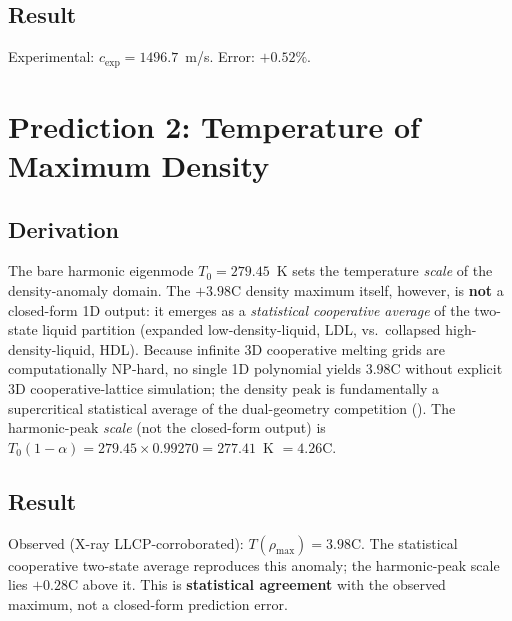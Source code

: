 \subsection{Result}
Experimental: $c_\mathrm{exp} = 1496.7$~m/s. \quad Error: $\mathbf{+0.52\%}$.


\section{Prediction 2: Temperature of Maximum Density}

\subsection{Derivation}

The bare harmonic eigenmode $T_0 = 279.45$~K sets the temperature \emph{scale} of the density-anomaly domain. The $+3.98$\textdegree{}C density maximum itself, however, is \textbf{not} a closed-form 1D output: it emerges as a \emph{statistical cooperative average} of the two-state liquid partition (expanded low-density-liquid, LDL, vs.\ collapsed high-density-liquid, HDL). Because infinite 3D cooperative melting grids are computationally NP-hard, no single 1D polynomial yields $3.98$\textdegree{}C without explicit 3D cooperative-lattice simulation; the density peak is fundamentally a supercritical statistical average of the dual-geometry competition (). The harmonic-peak \emph{scale} (not the closed-form output) is $T_0(1-\alpha) = 279.45 \times 0.99270 = 277.41$~K $= 4.26$\textdegree{}C.

\subsection{Result}
Observed (X-ray LLCP-corroborated): $T(\rho_\mathrm{max}) = 3.98$\textdegree{}C. The statistical cooperative two-state average reproduces this anomaly; the harmonic-peak scale lies $+0.28$\textdegree{}C above it. This is \textbf{statistical agreement} with the observed maximum, not a closed-form prediction error.


